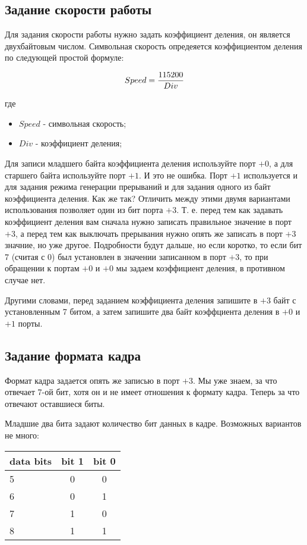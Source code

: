 \subsection{Задание скорости работы}

Для задания скорости работы нужно задать коэффициент деления, он является
двухбайтовым числом. Символьная скорость опредеяется коэффициентом деления
по следующей простой формуле:

\[
  Speed = {115200\over Div}
\]

где
\begin{itemize}
  \item $Speed$ - символьная скорость;
  \item $Div$ - коэффициент деления;
\end{itemize}

Для записи младшего байта коэффициента деления используйте порт $+0$, а для
старшего байта используйте порт $+1$. И это не ошибка. Порт $+1$ используется и
для задания режима генерации прерываний и для задания одного из байт
коэффициента деления. Как же так? Отличить между этими двумя вариантами
использования позволяет один из бит порта $+3$. Т. е. перед тем как задавать
коэффициент деления вам сначала нужно записать правильное значение в порт $+3$,
а перед тем как выключать прерывания нужно опять же записать в порт $+3$
значние, но уже другое. Подробности будут дальше, но если коротко, то если бит 7
(считая с 0) был установлен в значении записанном в порт $+3$, то при обращении
к портам $+0$ и $+0$ мы задаем коэффициент деления, в противном случае нет.

Другими словами, перед заданием коэффициента деления запишите в $+3$ байт с
установленным 7 битом, а затем запишите два байт коэффциента деления в $+0$ и
$+1$ порты.

\subsection{Задание формата кадра}

Формат кадра задается опять же записью в порт $+3$. Мы уже знаем, за что
отвечает 7-ой бит, хотя он и не имеет отношения к формату кадра. Теперь за что
отвечают оставшиеся биты.

Младшие два бита задают количество бит данных в кадре. Возможных вариантов не
много:
\begin{tabular}{|l|c|c|}
\hline
data bits & bit 1 & bit 0 \\
\hline
5 & 0 & 0 \\
6 & 0 & 1 \\
7 & 1 & 0 \\
8 & 1 & 1 \\
\hline
\end{tabular}

